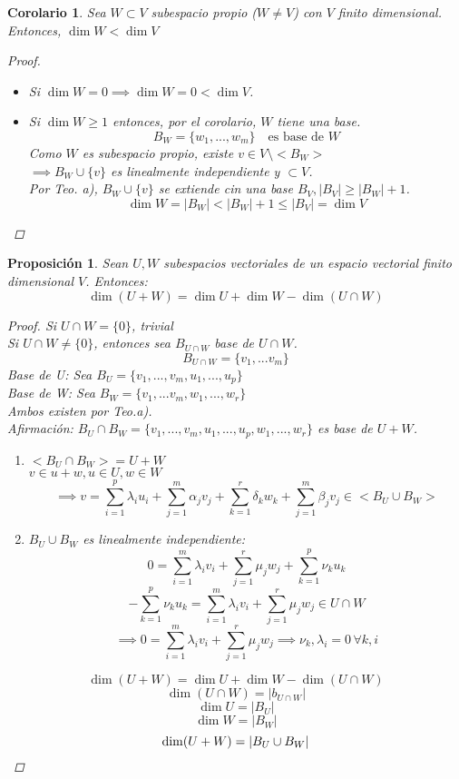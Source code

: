 \documentclass[11pt]{book}
\newtheorem{prop}[thm]{Proposición}
\newtheorem*{cor}{Corolario}
\theoremstyle{definition}
\begin{document}
\begin{cor}
	Sea $W\subset V$ subespacio propio ($W\neq V$) con $V$ finito dimensional.
	Entonces, $\dim W< \dim V$
	\begin{proof}
	\begin{itemize}
		\item Si $\dim W=0\implies \dim W=0<\dim V$.
		
		\item Si $\dim W\geq 1$ entonces, por el corolario, $W$ tiene una base.
		\[
		B_W=\{w_1,...,w_m\}\quad\textrm{es base de } W
		\]
		Como $W$ es subespacio propio, existe $v\in V\setminus<B_W>$\\
		$\implies B_W\cup\{v\}$ es linealmente independiente y $\subset V$.\\
		Por Teo. a), $B_W\cup\{v\}$ se extiende cin una base $B_V,|B_V|\geq|B_W|+1$.
		\[
		\dim W=|B_W|<|B_W|+1\leq |B_V|=\dim V
		\]
	\end{itemize}
	\end{proof}	
\end{cor}


\begin{prop}
Sean $U,W$ subespacios vectoriales de un espacio vectorial finito dimensional $V$. Entonces:
\[
\dim (U+W)=\dim U+\dim W-\dim (U\cap W)
\]
\begin{proof}
Si $U\cap W=\{0\}$, trivial\\
Si $U\cap W\neq\{0\}$, entonces sea $B_{U\cap W}$ base de $U\cap W$.
\[
B_{U\cap W}=\{v_1,...v_m\}
\]
Base de U: Sea $B_U=\{v_1,...,v_m,u_1,...,u_p\}$\\
Base de W: Sea $B_W=\{v_1,...v_m,w_1,...,w_r\}$\\
Ambos existen por Teo.a).\\
Afirmación: $B_U\cap B_W=\{v_1,...,v_m,u_1,...,u_p,w_1,...,w_r\}$ es base de $U+W$.
\begin{enumerate}
	\item $<B_U\cap B_W>=U+W$\\
	$v\in u+w,u\in U,w\in W$
	\[
	\implies v=\sum^{p}_{i=1}\lambda_i u_i+\sum^{m}_{j=1}\alpha_j v_j+\sum^{r}_{k=1}\delta_k w_k+\sum^{m}_{j=1}\beta_j v_j\in<B_U\cup B_W>
	\]
	
	\item $B_U\cup B_W$ es linealmente independiente:
	\[
	0=\sum^{m}_{i=1}\lambda_i v_i+\sum^{r}_{j=1}\mu_j w_j+\sum^{p}_{k=1}\nu_k u_k
	\]
	\[
	-\sum^{p}_{k=1}\nu_k u_k=\sum^{m}_{i=1}\lambda_i v_i+\sum^{r}_{j=1}\mu_j w_j \in U\cap W
	\]
	\[
	\implies 0=\sum^{m}_{i=1}\lambda_i v_i+\sum^{r}_{j=1}\mu_j w_j\implies \nu_k,\lambda_i=0\,\forall k,i
	\]
\end{enumerate}
\[\dim(U+W)=\dim U+\dim W-\dim(U\cap W)\]
\[\dim(U\cap W)=|b_{U\cap W}|\]
\[\dim U=|B_U|\]	
\[\dim W=|B_W|\]	
\[\dim(U+W)=|B_U\cup B_W|\qedhere\]
\end{proof}
\end{prop}
\end{document}
